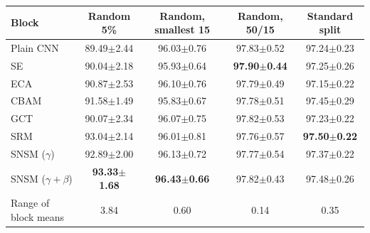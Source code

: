 \begin{tabular}{lcccc}
\toprule
Block & Random 5\% & Random, smallest 15 & Random, 50/15 & Standard split \\
\midrule
Plain CNN & 89.49$\pm$2.44 & 96.03$\pm$0.76 & 97.83$\pm$0.52 & 97.24$\pm$0.23 \\
SE & 90.04$\pm$2.18 & 95.93$\pm$0.64 & \textbf{97.90$\pm$0.44} & 97.25$\pm$0.26 \\
ECA & 90.87$\pm$2.53 & 96.10$\pm$0.76 & 97.79$\pm$0.49 & 97.15$\pm$0.22 \\
CBAM & 91.58$\pm$1.49 & 95.83$\pm$0.67 & 97.78$\pm$0.51 & 97.45$\pm$0.29 \\
GCT & 90.07$\pm$2.34 & 96.07$\pm$0.75 & 97.82$\pm$0.53 & 97.23$\pm$0.22 \\
SRM & 93.04$\pm$2.14 & 96.01$\pm$0.81 & 97.76$\pm$0.57 & \textbf{97.50$\pm$0.22} \\
SNSM ($\gamma$) & 92.89$\pm$2.00 & 96.13$\pm$0.72 & 97.77$\pm$0.54 & 97.37$\pm$0.22 \\
SNSM ($\gamma{+}\beta$) & \textbf{93.33$\pm$1.68} & \textbf{96.43$\pm$0.66} & 97.82$\pm$0.43 & 97.48$\pm$0.26 \\
\midrule
Range of block means & 3.84 & 0.60 & 0.14 & 0.35 \\
\bottomrule
\end{tabular}
